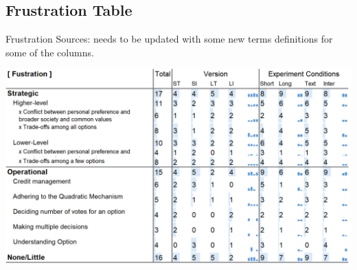 \subsection{Frustration Table}
\label{apdx:frus_table}
\begin{table}[H]
    \caption{Frustration Sources: needs to be updated with some new terms definitions for some of the columns.}
    \label{tbl:fustration}
    \includegraphics[width=\linewidth]{content/image/cog/fustration_table.png}
\end{table}

